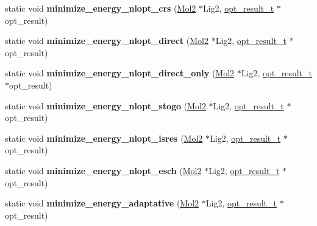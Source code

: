 \begin{DoxyCompactItemize}
\item 
\hypertarget{classOptimizer_a448c58b2b6f20e8ca68496b3ad74d5a0}{
static void {\bfseries minimize\_\-energy\_\-nlopt\_\-crs} (\hyperlink{classMol2}{Mol2} $\ast$Lig2, \hyperlink{structOptimizer_1_1opt__result__t}{opt\_\-result\_\-t} $\ast$opt\_\-result)}
\label{classOptimizer_a448c58b2b6f20e8ca68496b3ad74d5a0}

\item 
\hypertarget{classOptimizer_afb60b77b665a9faeebe5aab7bcf008c9}{
static void {\bfseries minimize\_\-energy\_\-nlopt\_\-direct} (\hyperlink{classMol2}{Mol2} $\ast$Lig2, \hyperlink{structOptimizer_1_1opt__result__t}{opt\_\-result\_\-t} $\ast$opt\_\-result)}
\label{classOptimizer_afb60b77b665a9faeebe5aab7bcf008c9}

\item 
\hypertarget{classOptimizer_a754f227df3287cc59a31e3ddfad9f490}{
static void {\bfseries minimize\_\-energy\_\-nlopt\_\-direct\_\-only} (\hyperlink{classMol2}{Mol2} $\ast$Lig2, \hyperlink{structOptimizer_1_1opt__result__t}{opt\_\-result\_\-t} $\ast$opt\_\-result)}
\label{classOptimizer_a754f227df3287cc59a31e3ddfad9f490}

\item 
\hypertarget{classOptimizer_a3c91bdf965360fc4fe48b5d78aef73f3}{
static void {\bfseries minimize\_\-energy\_\-nlopt\_\-stogo} (\hyperlink{classMol2}{Mol2} $\ast$Lig2, \hyperlink{structOptimizer_1_1opt__result__t}{opt\_\-result\_\-t} $\ast$opt\_\-result)}
\label{classOptimizer_a3c91bdf965360fc4fe48b5d78aef73f3}

\item 
\hypertarget{classOptimizer_a130bfd93e4af2e9bff264628f890418b}{
static void {\bfseries minimize\_\-energy\_\-nlopt\_\-isres} (\hyperlink{classMol2}{Mol2} $\ast$Lig2, \hyperlink{structOptimizer_1_1opt__result__t}{opt\_\-result\_\-t} $\ast$opt\_\-result)}
\label{classOptimizer_a130bfd93e4af2e9bff264628f890418b}

\item 
\hypertarget{classOptimizer_a7f9c6528edd2a11d4a38a4d4bfa5392f}{
static void {\bfseries minimize\_\-energy\_\-nlopt\_\-esch} (\hyperlink{classMol2}{Mol2} $\ast$Lig2, \hyperlink{structOptimizer_1_1opt__result__t}{opt\_\-result\_\-t} $\ast$opt\_\-result)}
\label{classOptimizer_a7f9c6528edd2a11d4a38a4d4bfa5392f}

\item 
\hypertarget{classOptimizer_a79586edeab7f4060a6ebd1e35b19c60d}{
static void {\bfseries minimize\_\-energy\_\-adaptative} (\hyperlink{classMol2}{Mol2} $\ast$Lig2, \hyperlink{structOptimizer_1_1opt__result__t}{opt\_\-result\_\-t} $\ast$opt\_\-result)}
\label{classOptimizer_a79586edeab7f4060a6ebd1e35b19c60d}


\end{DoxyCompactItemize}
